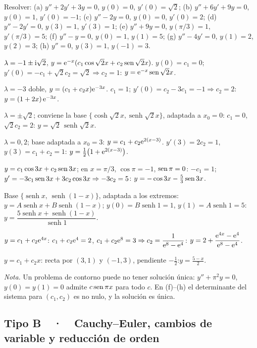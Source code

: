 \documentclass[11pt,twoside]{article}
\providecommand\senh{\operatorname{senh}}
\begin{document}
\begin{problema}\label{prob:2}
Resolver: (a) $y''+2y'+3y=0$, $y(0)=0$, $y'(0)=\sqrt2$; (b) $y''+6y'+9y=0$, $y(0)=1$, $y'(0)=-1$; (c) $y''-2y=0$,
$y(0)=0$, $y'(0)=2$; (d) $y''-2y'=0$, $y(3)=1$, $y'(3)=1$; (e) $y''+9y=0$, $y(\pi/3)=1$, $y'(\pi/3)=5$;
(f) $y''-y=0$, $y(0)=1$, $y(1)=5$; (g) $y''-4y'=0$, $y(1)=2$, $y(2)=3$; (h) $y''=0$, $y(3)=1$, $y(-1)=3$.
\end{problema}
\begin{resolucion}
\begin{pasos}
\item $\lambda=-1\pm\mathrm{i}\sqrt2$, $y=\mathrm{e}^{-x}(c_1\cos\sqrt2x+c_2\operatorname{sen}\sqrt2x)$. $y(0)=c_1=0$; $y'(0)=-c_1+\sqrt2c_2=\sqrt2\Rightarrow c_2=1$:
\quad $y=\mathrm{e}^{-x}\operatorname{sen}\sqrt2x$.
\item $\lambda=-3$ doble, $y=(c_1+c_2x)\mathrm{e}^{-3x}$. $c_1=1$; $y'(0)=c_2-3c_1=-1\Rightarrow c_2=2$:\quad $y=(1+2x)\,\mathrm{e}^{-3x}$.
\item $\lambda=\pm\sqrt2$; conviene la base $\{\cosh\sqrt2x,\senh\sqrt2x\}$, adaptada a $x_0=0$: $c_1=0$, $\sqrt2c_2=2$:
\quad $y=\sqrt2\,\senh\sqrt2x$.
\item $\lambda=0,2$; base adaptada a $x_0=3$: $y=c_1+c_2\mathrm{e}^{2(x-3)}$. $y'(3)=2c_2=1$, $y(3)=c_1+c_2=1$:
\quad $y=\tfrac12\big(1+\mathrm{e}^{2(x-3)}\big)$.
\item $y=c_1\cos3x+c_2\operatorname{sen}3x$; en $x=\pi/3$, $\cos\pi=-1$, $\operatorname{sen}\pi=0$: $-c_1=1$; $y'=-3c_1\operatorname{sen}3x+3c_2\cos3x\Rightarrow-3c_2=5$:
\quad $y=-\cos3x-\tfrac53\operatorname{sen}3x$.
\item Base $\{\senh x,\ \senh(1-x)\}$, adaptada a los extremos: $y=A\senh x+B\senh(1-x)$; $y(0)=B\senh1=1$, $y(1)=A\senh1=5$:
\quad $y=\dfrac{5\senh x+\senh(1-x)}{\senh1}$.
\item $y=c_1+c_2\mathrm{e}^{4x}$: $c_1+c_2\mathrm{e}^4=2$, $c_1+c_2\mathrm{e}^8=3\Rightarrow c_2=\dfrac1{\mathrm{e}^8-\mathrm{e}^4}$:
\quad $y=2+\dfrac{\mathrm{e}^{4x}-\mathrm{e}^{4}}{\mathrm{e}^{8}-\mathrm{e}^{4}}$.
\item $y=c_1+c_2x$: recta por $(3,1)$ y $(-1,3)$, pendiente $-\frac12$:\quad $y=\frac{5-x}{2}$.
\end{pasos}
\textit{Nota.} Un problema de contorno puede no tener solución única: $y''+\pi^2y=0$, $y(0)=y(1)=0$ admite $c\operatorname{sen}\pi x$
para todo $c$. En (f)--(h) el determinante del sistema para $(c_1,c_2)$ es no nulo, y la solución es única.
\end{resolucion}

\subsection{Tipo B\ \ ·\ \ Cauchy--Euler, cambios de variable y reducción de orden}
\end{document}
